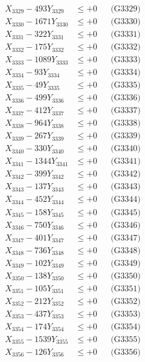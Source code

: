 \documentclass[a4paper,10pt]{article}
\begin{document}
{\begin{align}
X_{3329} - 493Y_{3329} &\leq +0 && \text{(G3329)} \\
X_{3330} - 1671Y_{3330} &\leq +0 && \text{(G3330)} \\
\allowbreak
X_{3331} - 322Y_{3331} &\leq +0 && \text{(G3331)} \\
X_{3332} - 175Y_{3332} &\leq +0 && \text{(G3332)} \\
X_{3333} - 1089Y_{3333} &\leq +0 && \text{(G3333)} \\
X_{3334} - 93Y_{3334} &\leq +0 && \text{(G3334)} \\
X_{3335} - 49Y_{3335} &\leq +0 && \text{(G3335)} \\
X_{3336} - 499Y_{3336} &\leq +0 && \text{(G3336)} \\
X_{3337} - 412Y_{3337} &\leq +0 && \text{(G3337)} \\
X_{3338} - 964Y_{3338} &\leq +0 && \text{(G3338)} \\
X_{3339} - 267Y_{3339} &\leq +0 && \text{(G3339)} \\
X_{3340} - 330Y_{3340} &\leq +0 && \text{(G3340)} \\
\allowbreak
X_{3341} - 1344Y_{3341} &\leq +0 && \text{(G3341)} \\
X_{3342} - 399Y_{3342} &\leq +0 && \text{(G3342)} \\
X_{3343} - 137Y_{3343} &\leq +0 && \text{(G3343)} \\
X_{3344} - 452Y_{3344} &\leq +0 && \text{(G3344)} \\
X_{3345} - 158Y_{3345} &\leq +0 && \text{(G3345)} \\
X_{3346} - 750Y_{3346} &\leq +0 && \text{(G3346)} \\
X_{3347} - 401Y_{3347} &\leq +0 && \text{(G3347)} \\
X_{3348} - 736Y_{3348} &\leq +0 && \text{(G3348)} \\
X_{3349} - 102Y_{3349} &\leq +0 && \text{(G3349)} \\
X_{3350} - 138Y_{3350} &\leq +0 && \text{(G3350)} \\
\allowbreak
X_{3351} - 105Y_{3351} &\leq +0 && \text{(G3351)} \\
X_{3352} - 212Y_{3352} &\leq +0 && \text{(G3352)} \\
X_{3353} - 437Y_{3353} &\leq +0 && \text{(G3353)} \\
X_{3354} - 174Y_{3354} &\leq +0 && \text{(G3354)} \\
X_{3355} - 1539Y_{3355} &\leq +0 && \text{(G3355)} \\
X_{3356} - 126Y_{3356} &\leq +0 && \text{(G3356)} \\

\end{align}}
\end{document}

